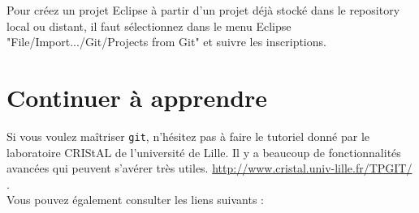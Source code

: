 \documentclass[final, a4paper, openbib, ]{article}
\begin{document}
Pour créez un projet Eclipse à partir d'un projet déjà stocké dans le repository local ou distant, il faut sélectionnez dans le menu Eclipse "File/Import.../Git/Projects from Git" et suivre les inscriptions.

%

\section{Continuer à apprendre}

Si vous voulez maîtriser \texttt{git}, n'hésitez pas à faire le tutoriel donné par le laboratoire CRIStAL de l'université de Lille.
Il y a beaucoup de fonctionnalités avancées qui peuvent s'avérer très utiles.
\url{http://www.cristal.univ-lille.fr/TPGIT/} .\\

Vous pouvez également consulter les liens suivants :
\end{document}
